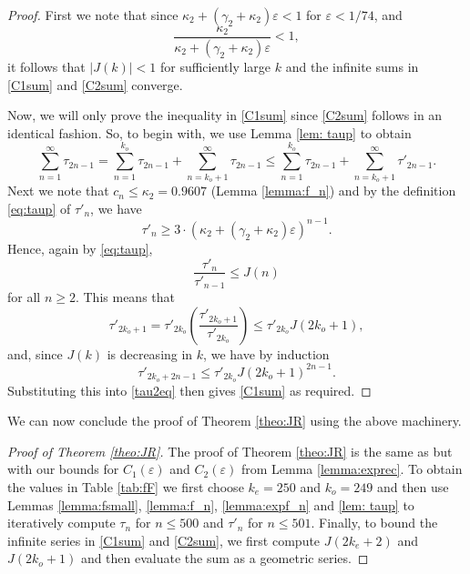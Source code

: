 \documentclass[12pt]{amsart}
\begin{document}
\begin{proof}
    First we note that since $\kappa_2+(\gamma_2+\kappa_2)\varepsilon<1$ for $\varepsilon<1/74$, and
    \begin{equation*}
        \frac{\kappa_2}{\kappa_2+(\gamma_2+\kappa_2)\varepsilon}<1,
    \end{equation*}
    it follows that $|J(k)|<1$ for sufficiently large $k$ and the infinite sums in \eqref{C1sum} and \eqref{C2sum} converge.
    
    Now, we will only prove the inequality in \eqref{C1sum} since \eqref{C2sum} follows in an identical fashion. So, to begin with, we use Lemma \ref{lem: taup} to obtain
    \begin{equation}\label{tau2eq}
        \sum_{n=1}^\infty\tau_{2n-1}=\sum_{n=1}^{k_o}\tau_{2n-1}+\sum_{n=k_o+1}^\infty\tau_{2n-1}\le \sum_{n=1}^{k_o}\tau_{2n-1}+\sum_{n=k_o+1}^\infty\tau'_{2n-1}.
    \end{equation}
    Next we note that $c_n\le\kappa_2=0.9607$ (Lemma \ref{lemma:f_n}) and by the definition \eqref{eq:taup} of $\tau'_n$, we have
    \begin{equation*}
        \tau'_n\ge 3\cdot(\kappa_2+(\gamma_2+\kappa_2)\varepsilon)^{n-1}.
    \end{equation*}
    Hence, again by \eqref{eq:taup},
    \begin{equation*}
        \frac{\tau'_n}{\tau'_{n-1}}\le J(n)
    \end{equation*}
    for all $n\ge 2$. This means that
    \begin{equation*}
        \tau'_{2k_o+1}=\tau'_{2k_o}\left(\frac{\tau'_{2k_o+1}}{\tau'_{2k_o}}\right)\le\tau'_{2k_o}J(2k_o+1),    
    \end{equation*}
    and, since $J(k)$ is decreasing in $k$, we have by induction
    \begin{equation*}
        \tau'_{2k_o+2n-1}\le\tau'_{2k_o}J(2k_o+1)^{2n-1}.
    \end{equation*}
    Substituting this into \eqref{tau2eq} then gives \eqref{C1sum} as required.
\end{proof}
We can now conclude the proof of Theorem \ref{theo:JR} using the above machinery.
\begin{proof}[Proof of Theorem \ref{theo:JR}]
    The proof of Theorem \ref{theo:JR} is the same as \cite[Theorem 9.7]{Nathanson} but with our bounds for $C_1(\varepsilon)$ and $C_2(\varepsilon)$ from Lemma \ref{lemma:exprec}. To obtain the values in Table \ref{tab:fF} we first choose $k_e=250$ and $k_o=249$ and then use Lemmas \ref{lemma:fsmall}, \ref{lemma:f_n}, \ref{lemma:expf_n} and \ref{lem: taup} to iteratively compute $\tau_n$ for $n\le 500$ and $\tau'_n$ for $n\le 501$. Finally, to bound the infinite series in \eqref{C1sum} and \eqref{C2sum}, we first compute $J(2k_e+2)$ and $J(2k_o+1)$ and then evaluate the sum as a geometric series.
\end{proof}
\end{document}
